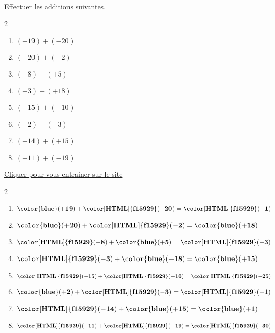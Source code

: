 \begin{exercice*}
    Effectuer les additions suivantes.
    \begin{multicols}2
        \begin{enumerate}            
                \item $ (+19) + (-20)$
                \item $ (+20) + (-2)$
                \item $ (-8) + (+5)$
                \item $ (-3) + (+18)$
                \item $ (-15) + (-10)$
                \item $ (+2) + (-3)$
                \item $ (-14) + (+15)$
                \item $ (-11) + (-19)$            
        \end{enumerate}
    \end{multicols}

    \href{https://coopmaths.fr/mathalea.html?ex=5R20,s=20,s2=false,s3=false,n=10,i=1&v=ex&z=1}{Cliquer pour vous entrainer sur le site \mathaleaLogo} 
\end{exercice*}
\begin{corrige}
    \phantom{rrr}    
    \begin{multicols}2
        \begin{enumerate}
            \item $ \mathbf{{\color{blue}(+19)}} + \mathbf{{\color[HTML]{f15929}(-20)}} = \mathbf{{\color[HTML]{f15929}(-1)}} $
            \item $ \mathbf{{\color{blue}(+20)}} + \mathbf{{\color[HTML]{f15929}(-2)}} = \mathbf{{\color{blue}(+18)}} $
            \item $ \mathbf{{\color[HTML]{f15929}(-8)}} + \mathbf{{\color{blue}(+5)}} = \mathbf{{\color[HTML]{f15929}(-3)}} $
            \item $ \mathbf{{\color[HTML]{f15929}(-3)}} + \mathbf{{\color{blue}(+18)}} = \mathbf{{\color{blue}(+15)}} $
            \item $ \mathbf{{\color[HTML]{f15929}(-15)}} + \mathbf{{\color[HTML]{f15929}(-10)}} = \mathbf{{\color[HTML]{f15929}(-25)}} $
            \item $ \mathbf{{\color{blue}(+2)}} + \mathbf{{\color[HTML]{f15929}(-3)}} = \mathbf{{\color[HTML]{f15929}(-1)}} $
            \item $ \mathbf{{\color[HTML]{f15929}(-14)}} + \mathbf{{\color{blue}(+15)}} = \mathbf{{\color{blue}(+1)}} $
            \item $ \mathbf{{\color[HTML]{f15929}(-11)}} + \mathbf{{\color[HTML]{f15929}(-19)}} = \mathbf{{\color[HTML]{f15929}(-30)}} $
        \end{enumerate}   
    \end{multicols}
\end{corrige}